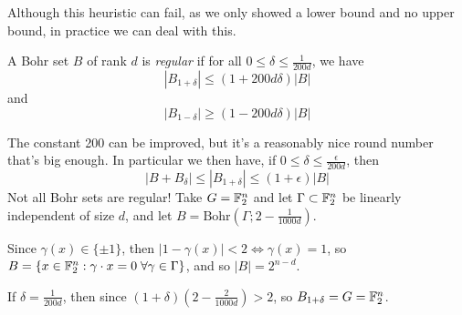 \documentclass[10pt,a4paper]{article}
\begin{document}
Although this heuristic can fail, as we only showed a lower bound and no upper bound, in practice we can deal with this.
\begin{definition}[Regularity]
  A Bohr set $B$ of rank $d$ is \emph{regular} if for all $0 \leq \delta \leq \frac{1}{200d}$, we have
  \[|B_{1+\delta}| \leq (1+200d \delta)|B|\]
  and
  \[|B_{1-\delta}| \geq (1-200d\delta)|B|\]
\end{definition}
The constant 200 can be improved, but it's a reasonably nice round number that's big enough. In particular we then have, if $0 \leq \delta \leq \frac{\epsilon}{200d}$, then
\[|B+B_\delta| \leq |B_{1+\delta}| \leq (1+\epsilon)|B|\]
Not all Bohr sets are regular! Take $G = \mathbb{F}_2^n$ and let $\Gamma \subset \mathbb{F}_2^n$ be linearly independent of size $d$, and let $B = \text{Bohr}(\Gamma; 2-\frac{1}{1000d})$.

Since $\gamma(x) \in \{\pm 1\}$, then $|1-\gamma(x)| < 2 \iff \gamma(x) = 1$, so $B = \{x \in \F_2^n: \gamma\cdot x = 0 \forall \gamma \in \Gamma\}$, and so $|B| = 2^{n-d}$.

If $\delta = \frac{1}{200d}$, then since $(1+\delta)(2-\frac{2}{1000d}) > 2$, so $B_{1+\delta} = G = \mathbb{F}_2^n$.
\end{document}
